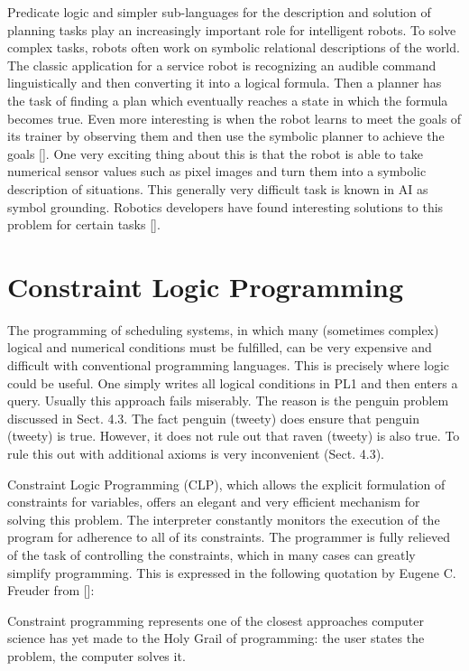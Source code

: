 \documentclass[10pt]{book}
\begin{document}
Predicate logic and simpler sub-languages for the description and solution of planning tasks play an increasingly important role for intelligent robots. To solve complex tasks, robots often work on symbolic relational descriptions of the world. The classic application for a service robot is recognizing an audible command linguistically and then converting it into a logical formula. Then a planner has the task of finding a plan which eventually reaches a state in which the formula becomes true. Even more interesting is when the robot learns to meet the goals of its trainer by observing them and then use the symbolic planner to achieve the goals [\cite{cubek2015highlevel}]. One very exciting thing about this is that the robot is able to take numerical sensor values such as pixel images and turn them into a symbolic description of situations. This generally very difficult task is known in AI as symbol grounding. Robotics developers have found interesting solutions to this problem for certain tasks [\cite{cubek2015critical}].

\section{Constraint Logic Programming}
The programming of scheduling systems, in which many (sometimes complex) logical and numerical conditions must be fulfilled, can be very expensive and difficult with conventional programming languages. This is precisely where logic could be useful. One simply writes all logical conditions in PL1 and then enters a query. Usually this approach fails miserably. The reason is the penguin problem discussed in Sect. 4.3. The fact penguin (tweety) does ensure that penguin (tweety) is true. However, it does not rule out that raven (tweety) is also true. To rule this out with additional axioms is very inconvenient (Sect. 4.3).

Constraint Logic Programming (CLP), which allows the explicit formulation of constraints for variables, offers an elegant and very efficient mechanism for solving this problem. The interpreter constantly monitors the execution of the program for adherence to all of its constraints. The programmer is fully relieved of the task of controlling the constraints, which in many cases can greatly simplify programming. This is expressed in the following quotation by Eugene C. Freuder from [\cite{freuder1997pursuit}]:
\begin{displayquote}
Constraint programming represents one of the closest approaches computer science has yet made to the Holy Grail of programming: the user states the problem, the computer solves it.
\end{displayquote}
\end{document}

